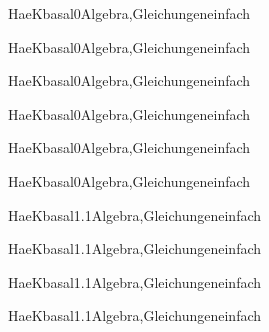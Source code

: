 \documentclass[12pt]{article}
\begin{document}
\begin{Add}{HaeK}{basal0}{Algebra,Gleichungen}{einfach}
\solution{ }
\end{Add}
\begin{Add}{HaeK}{basal0}{Algebra,Gleichungen}{einfach}
\end{Add}

\begin{Add}{HaeK}{basal0}{Algebra,Gleichungen}{einfach}
\solution{ }
\end{Add}
\begin{Add}{HaeK}{basal0}{Algebra,Gleichungen}{einfach}
\end{Add}

\begin{Add}{HaeK}{basal0}{Algebra,Gleichungen}{einfach}
\solution{ }
\end{Add}
\begin{Add}{HaeK}{basal0}{Algebra,Gleichungen}{einfach}
\end{Add}

\begin{Add}{HaeK}{basal1.1}{Algebra,Gleichungen}{einfach}
\solution{ }
\end{Add}
\begin{Add}{HaeK}{basal1.1}{Algebra,Gleichungen}{einfach}
\end{Add}

\begin{Add}{HaeK}{basal1.1}{Algebra,Gleichungen}{einfach}
\solution{ }
\end{Add}
\begin{Add}{HaeK}{basal1.1}{Algebra,Gleichungen}{einfach}
\end{Add}
\end{document}
